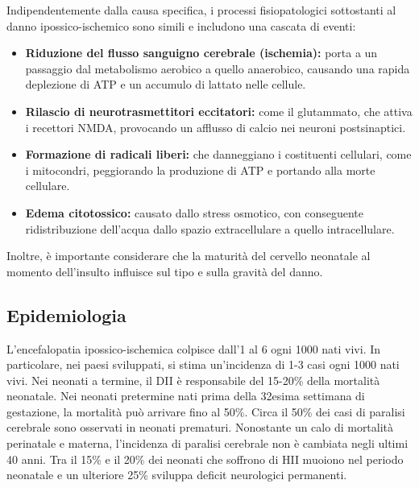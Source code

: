 Indipendentemente dalla causa specifica, i processi fisiopatologici sottostanti al danno ipossico-ischemico sono simili e includono una cascata di eventi:

\begin{itemize}
	\tightlist
	\item
	\textbf{Riduzione del flusso sanguigno cerebrale (ischemia):} porta a un passaggio dal metabolismo aerobico a quello anaerobico, causando una rapida deplezione di ATP e un accumulo di lattato nelle cellule.
	\item
	\textbf{Rilascio di neurotrasmettitori eccitatori:} come il glutammato, che attiva i recettori NMDA, provocando un afflusso di calcio nei neuroni postsinaptici.
	\item
	\textbf{Formazione di radicali liberi:} che danneggiano i costituenti cellulari, come i mitocondri, peggiorando la produzione di ATP e portando alla morte cellulare.
	\item
	\textbf{Edema citotossico:} causato dallo stress osmotico, con conseguente ridistribuzione dell'acqua dallo spazio extracellulare a quello intracellulare.
\end{itemize}

Inoltre, è importante considerare che la maturità del cervello neonatale al momento dell'insulto influisce sul tipo e sulla gravità del danno.

\subsection{Epidemiologia}

L'encefalopatia ipossico-ischemica colpisce dall'1 al 6 ogni 1000 nati vivi. In particolare, nei paesi sviluppati, si stima un'incidenza di 1-3 casi ogni 1000 nati vivi. Nei neonati a termine, il DII è responsabile del 15-20\% della mortalità neonatale. Nei neonati pretermine nati prima della 32esima settimana di gestazione, la mortalità può arrivare fino al 50\%. Circa il 50\% dei casi di paralisi cerebrale sono osservati in neonati prematuri. Nonostante un calo di mortalità perinatale e materna, l'incidenza di paralisi cerebrale non è cambiata negli ultimi 40 anni. Tra il 15\% e il 20\% dei neonati che soffrono di HII muoiono nel periodo neonatale e un ulteriore 25\% sviluppa deficit neurologici permanenti.

